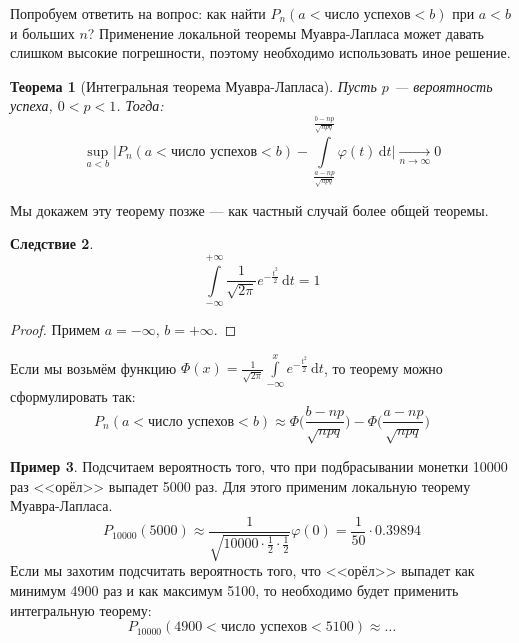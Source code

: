 \documentclass[11pt,openany,a4paper]{scrartcl}
\theoremstyle{plain}
\newtheorem{theorem}{Теорема}[section]
\newtheorem{corollary}[theorem]{Следствие}
\theoremstyle{definition}
\newtheorem{example}[theorem]{Пример}
\newcommand{\underto}[1]{\xrightarrow[#1]{}}
\newcommand{\dif}{\, \mathrm d}
\begin{document}
Попробуем ответить на вопрос: как найти $P_n(a < \text{число успехов} < b)$
при $a<b$ и больших $n$? Применение локальной теоремы Муавра-Лапласа может давать
слишком высокие погрешности, поэтому необходимо использовать иное решение.
\begin{theorem}[Интегральная теорема Муавра-Лапласа]
    Пусть $p$ — вероятность успеха, $0 < p < 1$. Тогда:
    $$
    \sup_{a<b} \Bigg| P_n(a < \text{число успехов} < b) -
    \int\limits_{\frac{a - np}{\sqrt{npq}}}^{\frac{b-np}{\sqrt{npq}}}
    \varphi(t) \dif t \Bigg| \underto{n \to \infty} 0
    $$
\end{theorem}

Мы докажем эту теорему позже — как частный случай более общей теоремы.

\begin{corollary}
    $$
    \int\limits_{-\infty}^{+\infty}
    \frac{1}{\sqrt{2\pi}}e^{-\frac{t^2}{2}}\dif t = 1
    $$
\end{corollary}
\begin{proof}
    Примем $a = -\infty$, $b = +\infty$.
\end{proof}

Если мы возьмём функцию $\Phi(x) = \frac{1}{\sqrt{2\pi}}\int\limits_{-\infty}^x
e^{-\frac{t^2}{2}}\dif t$,
то теорему можно сформулировать так:
$$
P_n(a < \text{число успехов} < b) \approx
\Phi\bigg(\frac{b-np}{\sqrt{npq}}\bigg) -
\Phi\bigg(\frac{a - np}{\sqrt{npq}}\bigg)
$$

\begin{example}
    Подсчитаем вероятность того, что при подбрасывании монетки 10000 раз <<орёл>>
    выпадет 5000 раз. Для этого применим локальную теорему Муавра-Лапласа.
    $$
    P_{10000}(5000) \approx
    \frac{1}{\sqrt{10000 \cdot \frac{1}{2} \cdot \frac{1}{2}}}\varphi(0) =
    \frac{1}{50} \cdot 0.39894
    $$
    Если мы захотим подсчитать вероятность того, что <<орёл>> выпадет как минимум 
    4900 раз и как максимум 5100, то необходимо будет применить интегральную
    теорему:
    $$
    P_{10000}(4900 < \text{число успехов} < 5100) \approx \ldots
    $$
\end{example}
\end{document}

